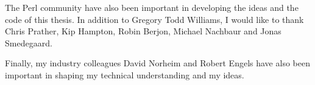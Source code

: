 The Perl community have also been important in developing the ideas
and the code of this thesis. In addition to Gregory Todd Williams, I
would like to thank Chris Prather, Kip Hampton, Robin Berjon, Michael
Nachbaur and Jonas Smedegaard.

Finally, my industry colleagues David Norheim and Robert Engels have
also been important in shaping my technical understanding and my
ideas.
